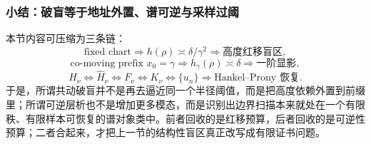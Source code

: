 \subsubsection{小结：破盲等于地址外置、谱可逆与采样过阈}\label{subsubsec:typed-address-biaxial-completion-comoving-summary}
本节内容可压缩为三条链：
\[
\text{fixed chart}
\Longrightarrow
h(\rho)\asymp \delta/\gamma^2
\Longrightarrow
\text{高度红移盲区},
\]
\[
\text{co-moving prefix }x_0=\gamma
\Longrightarrow
h_\gamma(\rho)\asymp \delta
\Longrightarrow
\text{一阶显影},
\]
\[
H_\nu
\Longleftrightarrow
\widehat H_\nu
\Longleftrightarrow
F_\nu
\Longleftrightarrow
K_\nu
\Longleftrightarrow
\{u_n\}
\Longrightarrow
\text{Hankel--Prony 恢复}.
\]
于是，所谓共动破盲并不是再去逼近同一个半径阈值，而是把高度依赖外置到前缀里；所谓可逆层析也不是增加更多模态，而是识别出边界扫描本来就处在一个有限秩、有限样本可恢复的谱对象类中。前者回收的是红移预算，后者回收的是可逆性预算；二者合起来，才把上一节的结构性盲区真正改写成有限证书问题。
